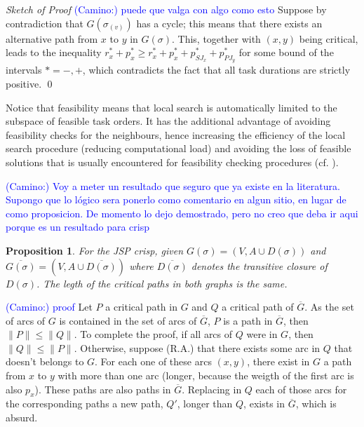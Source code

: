 \documentclass[preprint]{elsarticle}
\newcommand{\textcam}[1]{\textcolor{blue}{(Camino:) #1}}
\newtheorem{proposition}{Proposition}
\begin{document}
\emph{Sketch of Proof} \textcam{puede que valga con algo como esto}  Suppose by contradiction that $G(\sigma_{(v)})$ has a cycle; this means that there exists an alternative path from $x$ to $y$ in $G(\sigma)$. This, together with $(x,y)$ being critical, leads to the inequality $r_x^* + p_x^* \geq r_x^* + p_x^* + p_{SJ_x}^* + p_{PJ_y}^*$ for some bound of the intervals $*=-,+$, which contradicts the fact that all task durations are strictly positive. \qed

Notice that feasibility means that local search is automatically limited to the subspace of feasible task orders. It has the additional advantage of avoiding feasibility checks for the neighbours, hence increasing the efficiency of the local search procedure (reducing computational load) and avoiding the loss of feasible solutions that is usually encountered for feasibility checking procedures (cf. \cite{DellAmico1993}).

%
%
\textcam{Voy a meter un resultado que seguro que ya existe en la literatura. Supongo que lo lógico sera ponerlo como comentario en algun sitio, en lugar de como proposicion. De momento lo dejo demostrado, pero no creo que deba ir aqui porque es un resultado para crisp}
\begin{proposition}
For the JSP crisp, given $G(\sigma) =(V, A \cup D(\sigma))$ and $\overline{G(\sigma)} =(V, A \cup \overline{D(\sigma)})$ where $\overline{D(\sigma)}$ denotes the transitive closure of $D(\sigma)$. The legth of the critical paths in both graphs is the same.
\end{proposition}
\textcam{proof}
Let $P$ a critical path in $G$ and $Q$ a critical path of $\overline{G}$. As the set of arcs of $G$ is contained in the set of arcs of $\overline{G}$, $P$ is a path in $\overline{G}$, then $\|P\| \leq \|Q\|$.
To complete the proof, if all arcs of $Q$ were in $G$, then $\|Q\| \leq \|P\|$. Otherwise, suppose (R.A.) that there exists some arc in $Q$ that doesn't belongs to $G$. For each one of these arcs $(x,y)$, there exist in $G$ a path from $x$ to $y$ with more than one arc (longer, because the weigth of the first arc is also $p_x$). These paths are also paths in $\overline{G}$. Replacing in $Q$ each of those arcs for the corresponding paths a new path, $Q'$, longer than $Q$, exists in $\overline{G}$, which is absurd.
\end{document}
